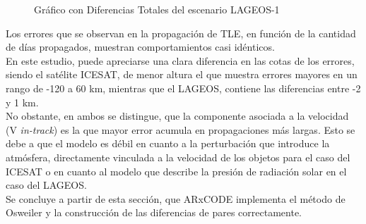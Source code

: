 \begin{figure}[h!]
\centering
  \caption{Gr\'afico con Diferencias Totales del escenario LAGEOS-1}
  \label{fig:lageosTot}
\end{figure}

Los errores que se observan en la propagaci\'on de TLE, en funci\'on de la cantidad de d\'ias propagados, muestran comportamientos casi id\'enticos.\\

En este estudio, puede apreciarse una clara diferencia en las cotas de los errores, siendo el sat\'elite ICESAT, de menor altura el que muestra errores mayores en un rango de -120 a 60 km, mientras que el LAGEOS, contiene las diferencias entre -2 y 1 km.\\

No obstante, en ambos se distingue, que la componente asociada a la velocidad (V {\it{in-track}}) es la que mayor error acumula en propagaciones m\'as largas. Esto se debe a que el modelo es d\'ebil en cuanto a la perturbaci\'on que introduce la atm\'osfera, directamente vinculada a la velocidad de los objetos para el caso del ICESAT o en cuanto al modelo que describe la presi\'on de radiaci\'on solar en el caso del LAGEOS.\\

Se concluye a partir de esta secci\'on, que ARxCODE implementa el m\'etodo de Osweiler y la construcci\'on de las diferencias de pares correctamente. 

